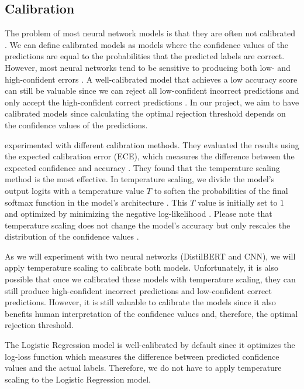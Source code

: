 \subsection{Calibration}
The problem of most neural network models is that they are often not calibrated \citep{guo2017calibration,sayin2021science}.
%
We can define calibrated models as models where the confidence values of the predictions are equal to the probabilities that the predicted labels are correct.
%
However, most neural networks tend to be sensitive to producing both low- and high-confident errors \citep{guo2017calibration, sayin2021science}.
%
A well-calibrated model that achieves a low accuracy score can still be valuable since we can reject all low-confident incorrect predictions and only accept the high-confident correct predictions \citep{sayin2021science}.
%
In our project, we aim to have calibrated models since calculating the optimal rejection threshold depends on the confidence values of the predictions.
%

%
\citet{guo2017calibration} experimented with different calibration methods.
%
They evaluated the results using the expected calibration error (ECE), which measures the difference between the expected confidence and accuracy \citep{guo2017calibration}.
%
They found that the temperature scaling method is the most effective.
%
In temperature scaling, we divide the model's output logits with a temperature value $T$ to soften the probabilities of the final softmax function in the model's architecture \citep{guo2017calibration}.
%
This $T$ value is initially set to $1$ and optimized by minimizing the negative log-likelihood \citep{guo2017calibration}.
%
Please note that temperature scaling does not change the model's accuracy but only rescales the distribution of the confidence values \citep{guo2017calibration}.
%

%
As we will experiment with two neural networks (DistilBERT and CNN), we will apply temperature scaling to calibrate both models.
%
Unfortunately, it is also possible that once we calibrated these models with temperature scaling, they can still produce high-confident incorrect predictions and low-confident correct predictions.
%
However, it is still valuable to calibrate the models since it also benefits human interpretation of the confidence values and, therefore, the optimal rejection threshold.
%

%
The Logistic Regression model is well-calibrated by default since it optimizes the log-loss function which measures the difference between predicted confidence values and the actual labels.
%
Therefore, we do not have to apply temperature scaling to the Logistic Regression model.

